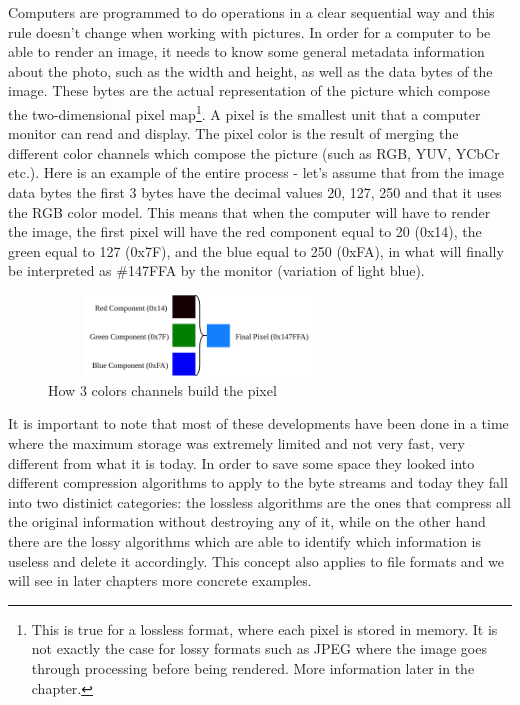 \begin{multicols}{2}
Computers are programmed to do operations in a clear sequential way and this rule doesn't change when working with pictures. In order for a computer to be able to render an image, it needs to know some general metadata information about the photo, such as the width and height, as well as the data bytes of the image. These bytes are the actual representation of the picture which compose the two-dimensional pixel map\footnote{This is true for a lossless format, where each pixel is stored in memory. It is not exactly the case for lossy formats such as JPEG where the image goes through processing before being rendered. More information later in the chapter.}. A pixel is the smallest unit that a computer monitor can read and display. The pixel color is the result of merging the different color channels which compose the picture (such as RGB, YUV, YCbCr etc.). Here is an example of the entire process - let's assume that from the image data bytes the first 3 bytes have the decimal values 20, 127, 250 and that it uses the RGB color model. This means that when the computer will have to render the image, the first pixel will have the red component equal to 20 (0x14), the green equal to 127 (0x7F), and the blue equal to 250 (0xFA), in what will finally be interpreted as \#147FFA by the monitor (variation of light blue). 

\begin{figure}[H]
    \centering
    \includegraphics[width=8cm,height=2.15cm,keepaspectratio]{pics/how_a_pixel_works}
    \caption{How 3 colors channels build the pixel}
    \label{Pixel Creation}
\end{figure}

It is important to note that most of these developments have been done in a time where the maximum storage was extremely limited and not very fast, very different from what it is today. In order to save some space they looked into different compression algorithms to apply to the byte streams and today they fall into two distinict categories: the lossless algorithms are the ones that compress all the original information without destroying any of it, while on the other hand there are the lossy algorithms which are able to identify which information is useless and delete it accordingly. This concept also applies to file formats and we will see in later chapters more concrete examples. 


\end{multicols}
